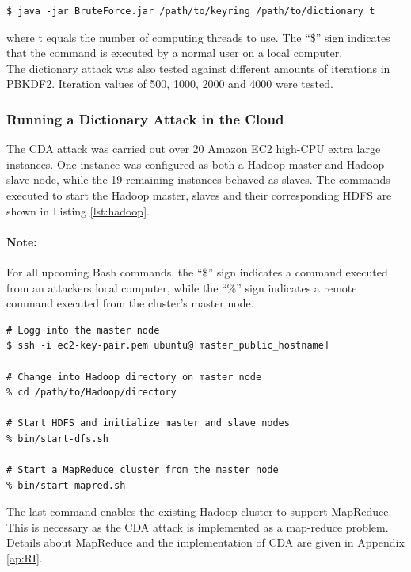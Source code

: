 \documentclass[pdftex,english,10pt,b5paper,twoside]{book}
\begin{document}
\lstset{label=lst:da, caption=Running local dictionary attack}
\begin{lstlisting}
$ java -jar BruteForce.jar /path/to/keyring /path/to/dictionary t
\end{lstlisting}
\noindent where t equals the number of computing threads to use. The ``\$'' sign
indicates that the command is executed by a normal user on a local computer.\\

\noindent The dictionary attack was also tested against different amounts of iterations in
PBKDF2. Iteration values of 500, 1000, 2000 and 4000 were tested.

\subsubsection{Running a Dictionary Attack in the Cloud}
The CDA attack was carried out over 20 Amazon EC2 high-CPU extra large
instances. One instance was configured as both a Hadoop master and Hadoop slave node, while the
19 remaining instances behaved as slaves. The commands executed
to start the Hadoop master, slaves and their corresponding \ac{HDFS} are shown
in Listing \ref{lst:hadoop}.

\paragraph{Note:}For all upcoming Bash commands, the ``\$'' sign indicates a command
executed from an attackers local computer, while the ``\%'' sign indicates a
remote command executed from the cluster's master node.

\lstset{language=bash, label=lst:hadoop, caption=Starting Hadoop cluster with HDFS}
\begin{lstlisting}
# Logg into the master node
$ ssh -i ec2-key-pair.pem ubuntu@[master_public_hostname]

# Change into Hadoop directory on master node
% cd /path/to/Hadoop/directory

# Start HDFS and initialize master and slave nodes
% bin/start-dfs.sh

# Start a MapReduce cluster from the master node
% bin/start-mapred.sh
\end{lstlisting}
The last command enables the existing
Hadoop cluster to support MapReduce. This is necessary as the CDA
attack is implemented as a map-reduce problem. Details about MapReduce and the
implementation of CDA are given in Appendix \ref{ap:RI}.\\
\end{document}
